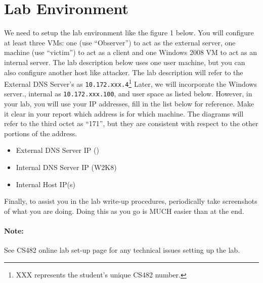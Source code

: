 \documentclass{article}
\begin{document}
\section{Lab Environment}


We need to setup the lab environment like the figure 1 below. You will configure at least three VMs: one \ubuntu (use ``Observer'') to act as the external server, one \ubuntu machine (use ``victim'') to act as a client and one Windows 2008 VM to act as an internal server.
The lab description below uses one user machine, but you can also configure another host like \ubuntu attacker. 
The lab description will refer to the External DNS Server's as {\tt 10.172.xxx.4}\footnote{XXX represents the student's unique CS482 number.}  Later, we will incorporate the Windows server., internal as {\tt 10.172.xxx.100}, and user space as listed below.  However, in your lab, you will use your IP addresses, fill in the list below for reference. Make it clear in your report which address is for which machine. The diagrams will refer to the third octet as ``171'', but they are consistent with respect to the other portions of the address.  



  


\begin{itemize}
\item External DNS Server IP (\ubuntu) \underline{\hspace{3cm}}
\item Internal DNS Server IP (W2K8) \underline{\hspace{3cm}}
\item Internal Host IP(s) \underline{\hspace{3cm}}
\end{itemize}

Finally, to assist you in the lab write-up procedures, periodically take screenshots of what you are doing.  Doing this as you go is MUCH easier than at the end.  

\paragraph {Note:} See CS482 online lab set-up page for any technical issues setting up the lab. 
\end{document}
